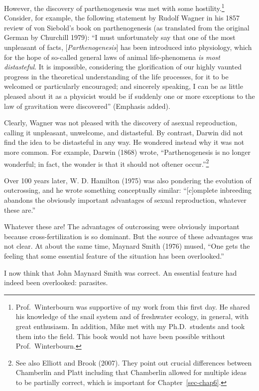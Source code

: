\documentclass[
  letterpaper,
]{book}
\begin{document}
However, the discovery of parthenogenesis was met with some
hostility.\footnote{Prof.~Winterbourn was supportive of my work from
  this first day. He shared his knowledge of the snail system and of
  freshwater ecology, in general, with great enthusiasm. In addition,
  Mike met with my Ph.D.~students and took them into the field. This
  book would not have been possible without Prof.~Winterbourn.}
Consider, for example, the following statement by Rudolf Wagner in his
1857 review of von Siebold's book on parthenogenesis (as translated from
the original German by Churchill 1979): ``I must unfortunately say that
one of the most unpleasant of facts, {[}\emph{Parthenogenesis}{]} has
been introduced into physiology, which for the hope of so-called general
laws of animal life-phenomena \emph{is most distasteful}. It is
impossible, considering the glorification of our highly vaunted progress
in the theoretical understanding of the life processes, for it to be
welcomed or particularly encouraged; and sincerely speaking, I can be as
little pleased about it as a physicist would be if suddenly one or more
exceptions to the law of gravitation were discovered'' (Emphasis added).

Clearly, Wagner was not pleased with the discovery of asexual
reproduction, calling it unpleasant, unwelcome, and distasteful. By
contrast, Darwin did not find the idea to be distasteful in any way. He
wondered instead why it was not more common. For example, Darwin (1868)
wrote, ``Parthenogenesis is no longer wonderful; in fact, the wonder is
that it should not oftener occur.''\footnote{See also Elliott and Brook
  (2007). They point out crucial differences between Chamberlin and
  Platt including that Chamberlin allowed for multiple ideas to be
  partially correct, which is important for Chapter~\ref{sec-chap6}.}

Over 100 years later, W. D. Hamilton (1975) was also pondering the
evolution of outcrossing, and he wrote something conceptually similar:
``{[}c{]}omplete inbreeding abandons the obviously important advantages
of sexual reproduction, whatever these are.''

Whatever these are! The advantages of outcrossing were obviously
important because cross-fertilization is so dominant. But the source of
these advantages was not clear. At about the same time, Maynard Smith
(1976) mused, ``One gets the feeling that some essential feature of the
situation has been overlooked.''

I now think that John Maynard Smith was correct. An essential feature
had indeed been overlooked: parasites.
\end{document}
